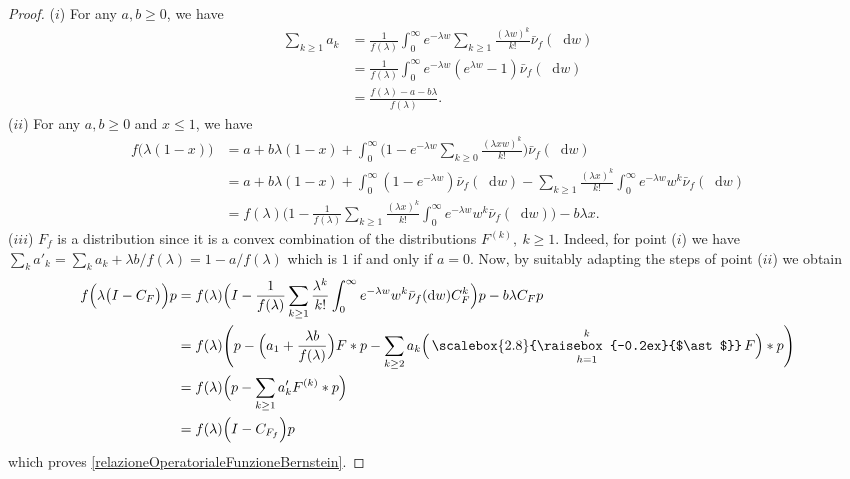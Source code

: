 \documentclass[12pt, twoside, english, headsepline]{article}
\newcommand*\dif{\mathop{}\!\mathrm{d}}  %
\newcommand{\conv}{\mathop{\scalebox{2.8}{\raisebox{-0.2ex}{$\ast$}}}} %
\theoremstyle{definition} %
\numberwithin{equation}{section} %
\begin{document}

\begin{proof}
	($i$) For any $a,b\ge0$, we have
	\begin{align}
		\sum_{k\ge1} a_k %
		&= \frac{1}{f(\lambda)}\int_0^\infty e^{-\lambda w}\sum_{k\ge1} \frac{(\lambda w)^k}{k!} \bar \nu_f(\dif w)\nonumber \\
		& =\frac{1}{f(\lambda)} \int_0^\infty  e^{-\lambda w} (e^{\lambda w}-1)\bar \nu_f(\dif w) \nonumber\\
		& = \frac{f(\lambda)-a- b\lambda}{f(\lambda)}.\label{calcoliPesiBernstainSommano1}
	\end{align}
	($ii$) For any $a,b\ge0$ and $x\le 1$, we have
	\begin{align}
		f\big(\lambda(1-x)\big) & = a+b\lambda(1-x) +\int_0^\infty \Big(1-e^{-\lambda w} \sum_{k\ge0}\frac{(\lambda x w)^k}{k!} \Big)\bar \nu_f(\dif w)\nonumber\\
		& =  a + b\lambda(1-x) + \int_0^\infty (1-e^{-\lambda w})\bar \nu_f (\dif w) - \sum_{k\ge1}\frac{(\lambda x )^k}{k!}  \int_0^\infty e^{-\lambda w} w^k \bar \nu_f(\dif w)\nonumber\\
		& = f(\lambda)\Big(1- \frac{1}{f(\lambda)}\sum_{k\ge1}\frac{(\lambda x )^k}{k!}  \int_0^\infty e^{-\lambda w} w^k \bar \nu_f(\dif w)\Big) -b\lambda x.
	\end{align}
	($iii$) $F_f$ is a distribution since it is a convex combination of the distributions $F^{(k)},\ k\ge1$. Indeed, for point ($i$) we have $\sum_{k} a'_k = \sum_{k}a_k+\lambda b/f(\lambda) = 1-a/f(\lambda)$ which is $1$ if and only if $a=0$.
	Now, by suitably adapting the steps of point ($ii$) we obtain
	\begin{align}
		f\Big(\lambda\big(I-C_F\big)\Big) p& =  f(\lambda)\Big(I- \frac{1}{f(\lambda)}\sum_{k\ge1}\frac{\lambda ^k}{k!}  \int_0^\infty e^{-\lambda w} w^k \bar \nu_f(\dif w)C_F^k\Big)p - b\lambda C_Fp \nonumber \\
		& =  f(\lambda)\Bigg(p- \Big(a_1+\frac{\lambda b}{f(\lambda)}\Big)F\ast p - \sum_{k\ge2}a_k \Big(\conv_{h=1}^k F\Big)\ast p \Bigg) \nonumber \\
		& = f(\lambda) \Big(p- \sum_{k\ge1} a'_k F^{(k)}\ast p \Big)\nonumber\\
		& =  f(\lambda) \Big(I- C_{F_f} \Big)p \nonumber
	\end{align}
	which proves \eqref{relazioneOperatorialeFunzioneBernstein}.
\end{proof}
\end{document}
